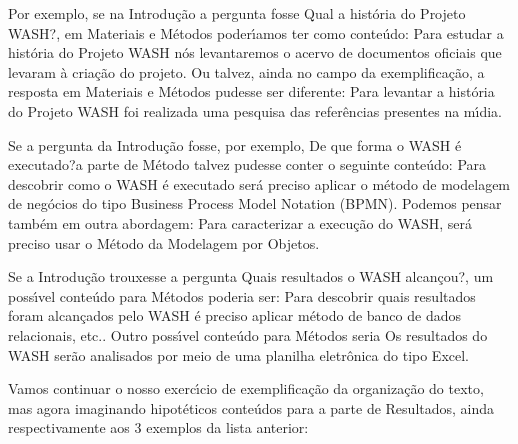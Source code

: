 \documentclass[
12pt,		%
openright,	%
twoside,  %
a4paper,			%
chapter=TITLE,		%
english,			%
french,				%
spanish,			%
brazil				%
]{USPSC-classe/USPSC_RedarTex}
\begin{document}
\begin{alineas}
\item Por exemplo, se na Introdu\c{c}\~ao a pergunta fosse \textquotedbl Qual a hist\'oria do Projeto WASH?\textquotedbl , em Materiais e M\'etodos poder\'{\i}amos ter como  conte\'udo: \textquotedbl Para estudar a hist\'oria do Projeto WASH n\'os levantaremos o acervo de documentos oficiais que levaram \`a cria\c{c}\~ao do projeto\textquotedbl . Ou talvez, ainda no campo da exemplifica\c{c}\~ao, a resposta em Materiais e M\'etodos pudesse ser diferente: \textquotedbl Para levantar a hist\'oria do Projeto WASH foi realizada uma pesquisa das refer\^encias presentes na m\'{\i}dia\textquotedbl .
\item Se a pergunta da Introdu\c{c}\~ao fosse, por exemplo, \textquotedbl De que forma o WASH \'e executado?\textquotedbl  a parte de M\'etodo talvez pudesse conter o seguinte conte\'udo: \textquotedbl Para descobrir como o WASH \'e executado ser\'a preciso aplicar o m\'etodo de modelagem de neg\'ocios do tipo Business Process Model Notation (BPMN)\textquotedbl . Podemos pensar tamb\'em em outra abordagem: \textquotedbl Para caracterizar a execu\c{c}\~ao do WASH, ser\'a preciso usar o M\'etodo da Modelagem por Objetos\textquotedbl .
\item Se a Introdu\c{c}\~ao trouxesse a pergunta \textquotedbl Quais resultados o WASH alcan\c{c}ou?\textquotedbl , um poss\'{\i}vel conte\'udo para M\'etodos poderia ser: \textquotedbl Para descobrir quais resultados foram alcan\c{c}ados pelo WASH \'e preciso aplicar m\'etodo de banco de dados relacionais, etc.\textquotedbl . Outro poss\'{\i}vel conte\'udo para M\'etodos seria \textquotedbl Os resultados do WASH ser\~ao analisados por meio de uma planilha eletr\^onica do tipo Excel\textquotedbl .
\end{alineas}

Vamos continuar o nosso exerc\'{\i}cio de exemplifica\c{c}\~ao da organiza\c{c}\~ao do texto, mas agora imaginando hipot\'eticos conte\'udos para a parte de Resultados, ainda respectivamente aos 3 exemplos da lista anterior:
\end{document}
